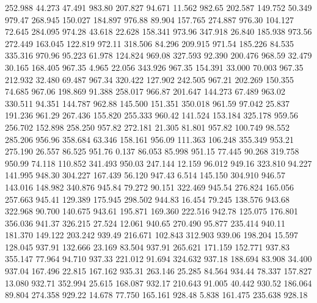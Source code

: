  252.988   44.273   47.491       983.80
 207.827   94.671   11.562       982.65
 202.587  149.752   50.349       979.47
 268.945  150.027  184.897       976.88
  89.904  157.765  274.887       976.30
 104.127   72.645  284.095       974.28
  43.618   22.628  158.341       973.96
 347.918   26.840  185.938       973.56
 272.449  163.045  122.819       972.11
 318.506   84.296  209.915       971.54
 185.226   84.535  335.316       970.96
  95.223   61.978  124.824       969.08
 327.593   92.390  200.476       968.59
  32.479   30.165  168.405       967.35
   4.965   22.056  343.926       967.35
 154.391   33.000   70.003       967.35
 212.932   32.480   69.487       967.34
 320.422  127.902  242.505       967.21
 202.269  150.355   74.685       967.06
 198.869   91.388  258.017       966.87
 201.647  144.273   67.489       963.02
 330.511   94.351  144.787       962.88
 145.500  151.351  350.018       961.59
  97.042   25.837  191.236       961.29
 267.436  155.820  255.333       960.42
 141.524  153.184  325.178       959.56
 256.702  152.898  258.250       957.82
 272.181   21.305   81.801       957.82
 100.749   98.552  285.206       956.96
 358.684   63.346  158.161       956.09
 111.363  106.248  355.349       953.21
 275.190   26.557   86.525       951.76
   0.137   86.053   85.998       951.15
  77.445   90.268  319.758       950.99
  74.118  110.852  341.493       950.03
 247.144   12.159   96.012       949.16
 323.810   94.227  141.995       948.30
 304.227  167.439   56.120       947.43
   6.514  145.150  304.910       946.57
 143.016  148.982  340.876       945.84
  79.272   90.151  322.469       945.54
 276.824  165.056  257.663       945.41
 129.389  175.945  298.502       944.83
  16.454   79.245  138.576       943.68
 322.968   90.700  140.675       943.61
 195.871  169.360  222.516       942.78
 125.075  176.801  356.036       941.37
 326.215   27.524   12.061       940.65
 270.490   95.877  235.414       940.11
 181.370  149.122  203.242       939.49
 216.671  102.843  312.903       939.06
 198.204   15.597  128.045       937.91
 132.666   23.169   83.504       937.91
 265.621  171.159  152.771       937.83
 355.147   77.964   94.710       937.33
 221.012   91.694  324.632       937.18
 188.694   83.908   34.400       937.04
 167.496   22.815  167.162       935.31
 263.146   25.285   84.564       934.44
  78.337  157.827   13.080       932.71
 352.994   25.615  168.087       932.17
 210.643   91.005   40.442       930.52
 186.064   89.804  274.358       929.22
  14.678   77.750  165.161       928.48
   5.838  161.475  235.638       928.18
